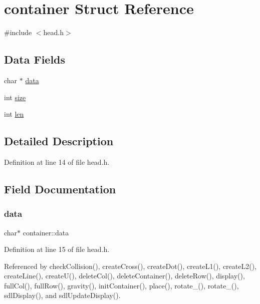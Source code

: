 \hypertarget{structcontainer}{}\section{container Struct Reference}
\label{structcontainer}


{\ttfamily \#include $<$head.\+h$>$}

\subsection*{Data Fields}
\begin{DoxyCompactItemize}
\item 
char $\ast$ \hyperlink{structcontainer_aefae69762fe9c24169e2ca5418a711a1}{data}
\item 
int \hyperlink{structcontainer_a1e938d250074e70b9778df1b59121744}{size}
\item 
int \hyperlink{structcontainer_a0069496fb95c879cd33fb79ab726e81a}{len}
\end{DoxyCompactItemize}


\subsection{Detailed Description}


Definition at line 14 of file head.\+h.



\subsection{Field Documentation}
\mbox{\label{structcontainer_aefae69762fe9c24169e2ca5418a711a1}} 
\subsubsection{\texorpdfstring{data}{data}}
{\footnotesize\ttfamily char$\ast$ container\+::data}



Definition at line 15 of file head.\+h.



Referenced by check\+Collision(), create\+Cross(), create\+Dot(), create\+L1(), create\+L2(), create\+Line(), create\+U(), delete\+Col(), delete\+Container(), delete\+Row(), display(), full\+Col(), full\+Row(), gravity(), init\+Container(), place(), rotate\+\_(), rotate\+\_(), sdl\+Display(), and sdl\+Update\+Display().

